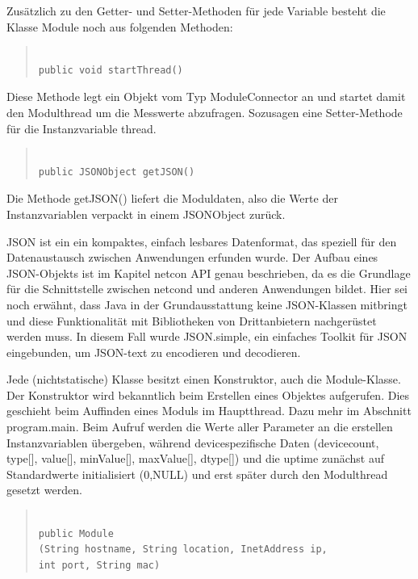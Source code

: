 \documentclass[a4paper,14pt,headsepline]{scrartcl}
\begin{document}
Zusätzlich zu den Getter- und Setter-Methoden für jede Variable besteht die Klasse Module noch aus folgenden Methoden:

\begin{quote}
\begin{verbatim}

public void startThread() 

\end{verbatim}
\end{quote}

Diese Methode legt ein Objekt vom Typ ModuleConnector an und startet damit den Modulthread um die Messwerte abzufragen. Sozusagen eine Setter-Methode für die Instanzvariable thread.  

\newpage

\begin{quote}
\begin{verbatim}

public JSONObject getJSON()

\end{verbatim}
\end{quote}

Die Methode getJSON() liefert die Moduldaten, also die Werte der Instanzvariablen verpackt in einem JSONObject zurück. 

JSON ist ein ein kompaktes, einfach lesbares Datenformat, das speziell für den Datenaustausch zwischen Anwendungen erfunden wurde. Der Aufbau eines JSON-Objekts ist im Kapitel netcon API genau beschrieben, da es die Grundlage für die Schnittstelle zwischen netcond und anderen Anwendungen bildet. Hier sei noch erwähnt, dass Java in der Grundausstattung keine JSON-Klassen mitbringt und diese Funktionalität mit Bibliotheken von Drittanbietern nachgerüstet werden muss. In diesem Fall wurde JSON.simple, ein einfaches Toolkit für JSON eingebunden, um JSON-text zu encodieren und decodieren.

Jede (nichtstatische) Klasse besitzt einen Konstruktor, auch die Module-Klasse. Der Konstruktor wird bekanntlich beim Erstellen eines Objektes aufgerufen. Dies geschieht beim Auffinden eines Moduls im Hauptthread. Dazu mehr im Abschnitt program.main. Beim Aufruf werden die Werte aller Parameter an die erstellen Instanzvariablen übergeben, während devicespezifische Daten (devicecount, type[], value[], minValue[], maxValue[], dtype[]) und die uptime zunächst auf Standardwerte initialisiert (0,NULL) und erst später durch den Modulthread gesetzt werden. 
\begin{quote}
\begin{verbatim}

public Module
(String hostname, String location, InetAddress ip, 
int port, String mac)

\end{verbatim}
\end{quote}
\end{document}
